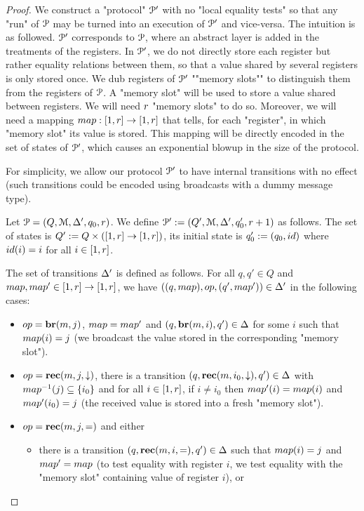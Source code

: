 \begin{proof}
	We construct a "protocol" $\mathcal{P}'$ with no "local equality tests" so that any "run" of $\mathcal{P}$ may be turned into an execution of $\mathcal{P}'$ and vice-versa. 
	The intuition is as followed. $\mathcal{P}'$ corresponds to $\mathcal{P}$, where an abstract layer is added in the treatments of the registers. In $\mathcal{P}'$, we do not directly store each register but rather equality relations between them, so that a value shared by several registers is only stored once. We dub registers of $\mathcal{P}'$ ""memory slots"" to distinguish them from the registers of $\mathcal{P}$. A "memory slot" will be used to store a value shared between registers. 
	We will need $r$ "memory slots" to do so. Moreover, we will need a mapping $\map : \nset{1}{r} \to \nset{1}{r}$ that tells, for each "register", in which "memory slot" its value is stored. This mapping will be directly encoded in the set of states of $\mathcal{P}'$, which causes an exponential blowup in the size of the protocol.
	
	For simplicity, we allow our protocol $\mathcal{P}'$ to have internal transitions with no effect (such transitions could be encoded using broadcasts with a dummy message type). 
	
	Let $\mathcal{P} = (Q, \mathcal{M}, \Delta', q_0, r)$. 
	We define $\mathcal{P}' := (Q', \mathcal{M}, \Delta', q_0', r +1)$ as follows. The set of states is $Q' := Q \times ([1,r] \to [1,r])$, its initial state is $q_0' := (q_0, \idmap)$ where $\idmap(i) = i$ for all $i \in [1,r]$. 
	
	The set of transitions $\Delta'$ is defined as follows.
	For all $q,q' \in Q$ and $\map, \map' \in \nset{1}{r} \to \nset{1}{r}$, we have $((q, \map), \op, (q', \map')) \in \transitions'$ in the following cases:
	
	\begin{itemize}
		\item $\op = \br{m}{j}$, 
		$\map = \map'$ and $(q, \textbf{br}(m, i), q') \in \Delta$ for some $i$ such that $\map(i) = j$ (we broadcast the value stored in the corresponding "memory slot").
		
		\item $\op=\rec{m}{j}{\enregact}$, there is a transition $(q, \textbf{rec}(m, i_0, \downarrow), q') \in \Delta$ with $\map^{-1}(j) \subseteq \set{i_0}$ and for all $i \in [1,r]$, if $i \ne i_0$ then $\map'(i) = \map(i)$ and $\map'(i_0) = j$ (the received value is stored into a fresh "memory slot").
		
		\item $\op = \rec{m}{j}{\eqtestact}$ and either
		\begin{itemize}
			\item there is a transition $(q, \textbf{rec}(m, i, {=}), q') \in \Delta$ such that $\map(i)=j$ and $\map'=\map$ (to test equality with register $i$, we test equality with the "memory slot" containing value of register $i$), or
			

\end{itemize}
\end{itemize}
\end{proof}
